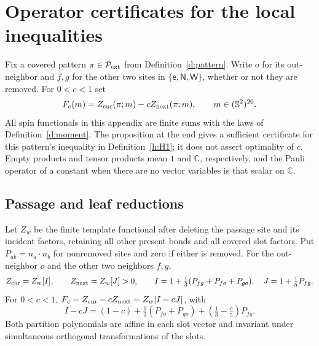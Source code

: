 

\section{Operator certificates for the local inequalities}\label{s:local-operator}

Fix a covered pattern \(\pi\in\mathcal P_{\rm ext}\) from
Definition~\ref{d:pattern}.  Write \(o\) for its out-neighbor and
\(f,g\) for the other two sites in
\(\{\mathsf e,\mathsf N,\mathsf W\}\), whether or not they are
removed.  For \(0<c<1\) set
\[
 F_c(m)=Z_{\rm cur}(\pi;m)-cZ_{\rm next}(\pi;m),
 \qquad m\in(\mathbb S^2)^{20}.
\]
All spin functionals in this appendix are finite sums with the laws
of Definition~\ref{d:moment}.  The proposition at the end gives a
sufficient certificate for this pattern's inequality in
Definition~\ref{h:H1}; it does not assert optimality of \(c\).
Empty products and tensor products mean \(1\) and \(\mathbb C\),
respectively, and the Pauli operator of a constant when there are
no vector variables is that scalar on \(\mathbb C\).

\subsection{Passage and leaf reductions}

\begin{lemma}\label{l:Iw}
Let \(Z_w\) be the finite template functional after deleting
the passage site and its incident factors, retaining all other
present bonds and all covered slot factors. Put \(P_{ab}=n_a\cdot n_b\)
for nonremoved sites and zero if either is removed.
For the out-neighbor \(o\) and the other two neighbors \(f,g\),
\[
 Z_{\rm cur}=Z_w[I],\qquad Z_{\rm next}=Z_w[J]>0,\qquad
 I=1+\tfrac13(P_{fg}+P_{fo}+P_{go}),\quad J=1+\tfrac15P_{fg}.
\]
For \(0<c<1\), \(F_c=Z_{\rm cur}-cZ_{\rm next}=Z_w[I-cJ]\), with
\[
 I-cJ=(1-c)+\tfrac13(P_{fo}+P_{go})+(\tfrac13-\tfrac c5)P_{fg}.
\]
Both partition polynomials are affine in each slot vector and
invariant under simultaneous orthogonal transformations of the slots.
\end{lemma}

